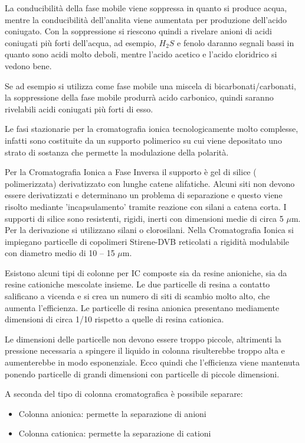 La conducibilità della fase mobile viene soppressa in quanto si produce acqua, mentre la conducibilità dell'analita viene aumentata per produzione dell'acido coniugato. Con la soppressione si riescono quindi a rivelare anioni di acidi coniugati più forti dell'acqua, ad esempio, $H_2S$ e fenolo daranno segnali bassi in quanto sono acidi molto deboli, mentre l'acido acetico e l'acido cloridrico si vedono bene.

Se ad esempio si utilizza come fase mobile una miscela di bicarbonati/carbonati, la soppressione della fase mobile produrrà acido carbonico, quindi saranno rivelabili acidi coniugati più forti di esso.

Le fasi stazionarie per la cromatografia ionica tecnologicamente molto complesse, infatti sono costituite da un supporto polimerico su cui viene depositato uno strato di sostanza che permette la modulazione della polarità.

Per la Cromatografia Ionica a Fase Inversa il supporto è gel di silice ( polimerizzata) derivatizzato con lunghe catene alifatiche.
Alcuni siti non devono essere derivatizzati e determinano un problema di separazione e questo viene risolto mediante 'incapsulamento' tramite reazione con
silani a catena corta. I supporti di silice sono resistenti, rigidi, inerti con dimensioni medie di circa 5 $\mu$m.
Per la derivazione si utilizzano silani o clorosilani.
Nella Cromatografia Ionica si impiegano particelle di copolimeri Stirene-DVB reticolati a rigidità modulabile con diametro medio di 10 – 15 $\mu$m.

Esistono alcuni tipi di colonne per IC composte sia da resine anioniche, sia da resine cationiche mescolate insieme. Le due particelle di resina a contatto salificano
a vicenda e si crea un numero di siti di scambio molto alto, che aumenta l'efficienza. Le particelle di resina anionica presentano mediamente dimensioni di circa 1/10
rispetto a quelle di resina cationica.

Le dimensioni delle particelle non devono essere troppo piccole, altrimenti la pressione necessaria a spingere il liquido in
colonna risulterebbe troppo alta e aumenterebbe in modo esponenziale. Ecco quindi che l'efficienza viene mantenuta ponendo particelle di grandi dimensioni con particelle
di piccole dimensioni. 



A seconda del tipo di colonna cromatografica è possibile separare:
\begin{itemize}
\item Colonna anionica: permette la separazione di anioni
\item Colonna cationica: permette la separazione di cationi
\end{itemize}

